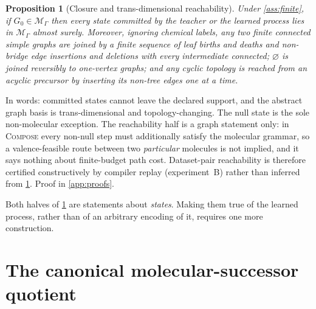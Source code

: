 \documentclass{article}
\newcommand{\method}{\textsc{Compose}\xspace}
\newcommand{\M}{\mathcal{M}_{\Gamma}}
\newtheorem{proposition}[theorem]{Proposition}
\theoremstyle{definition}
\theoremstyle{remark}
\begin{document}
\begin{proposition}[Closure and trans-dimensional reachability]\label{prop:closure}
Under \cref{ass:finite}, if $G_0\in\M$ then every state committed by the teacher or the learned process lies in $\M$ almost surely. Moreover, ignoring chemical labels, any two finite connected simple graphs are joined by a finite sequence of leaf births and deaths and non-bridge edge insertions and deletions with every intermediate connected; $\varnothing$ is joined reversibly to one-vertex graphs; and any cyclic topology is reached from an acyclic precursor by inserting its non-tree edges one at a time.
\end{proposition}

In words: committed states cannot leave the declared support, and the abstract graph basis is trans-dimensional and topology-changing. The null state is the sole non-molecular exception. The reachability half is a graph statement only: in \method every non-null step must additionally satisfy the molecular grammar, so a valence-feasible route between two \emph{particular} molecules is not implied, and it says nothing about finite-budget path cost. Dataset-pair reachability is therefore certified constructively by compiler replay (experiment~B) rather than inferred from \cref{prop:closure}. Proof in \cref{app:proofs}.

Both halves of \cref{prop:closure} are statements about \emph{states}. Making them true of the learned process, rather than of an arbitrary encoding of it, requires one more construction.

\section{The canonical molecular-successor quotient}
\label{sec:quotient-section}
\end{document}

